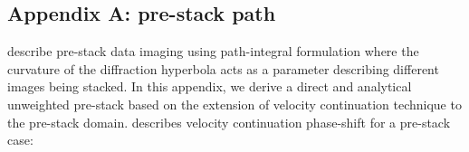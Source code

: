 



\appendix
\subsection{Appendix A: pre-stack path}

\cite{keydar09} describe pre-stack data imaging using path-integral formulation where the
curvature of the diffraction hyperbola acts as a parameter describing different images
being stacked. In this appendix, we derive a direct and  analytical 
unweighted pre-stack  based on the extension of velocity continuation
technique to the pre-stack domain.   
\cite{Fomel_03_VC_,Fomel_03_VC} describes velocity continuation phase-shift
for a pre-stack case:

